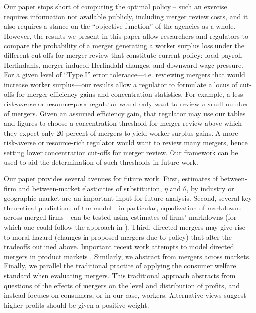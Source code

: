 \documentclass[12pt]{article}
\theoremstyle{prop}
\begin{document}
Our paper stops short of computing the optimal policy -- such an exercise requires information not available publicly, including merger review costs, and it also requires a stance on the ``objective function'' of the agencies as a whole. 
However, the results we present in this paper allow researchers and regulators to compare the probability of a merger generating a worker surplus loss under the different cut-offs for merger review that constitute current policy:
local payroll Herfindahls, merger-induced Herfindahl changes, and downward wage pressure.  
For a given level of ``Type I'' error tolerance---i.e. reviewing mergers that would increase worker surplus---our results allow a regulator to  formulate a locus of cut-offs for merger efficiency gains and concentration statistics.
For example, a less risk-averse or resource-poor regulator would only want to review a small number of mergers. 
Given an assumed efficiency gain, that regulator may use our tables and figures to choose a concentration threshold for merger review above which they expect only 20 percent of mergers to yield worker surplus gains. 
A more risk-averse or resource-rich regulator would want to review many mergers, hence setting lower concentration cut-offs for merger review.  
Our framework can be used to aid the determination of such thresholds in future work. 

 
Our paper provides several avenues for future work.  
First,  estimates of between-firm and between-market elasticities of substitution, $\eta$ and $\theta$, by industry or geographic market are an important input for future analysis. 
Second, several key theoretical predictions of the model---in particular, equalization of markdowns across merged firms---can be tested using estimates of firms' markdowns (for which one could follow the approach in 
\citet{yeh2022monopsony}). 
Third, directed mergers may give rise to moral hazard (changes in proposed mergers due to policy) that alter the tradeoffs outlined above. 
Important recent work attempts to model   directed mergers in product markets \citep{ThomasJMP,FilipJMP}. 
Similarly, we abstract from mergers across markets. 
Finally, we parallel the traditional practice of applying the consumer welfare standard when evaluating mergers. 
This traditional approach abstracts from questions of the effects of mergers on the level and distribution of profits, and instead focuses on consumers, or in our case, workers. 
Alternative views suggest higher profits should be given a positive weight. 
\end{document}
